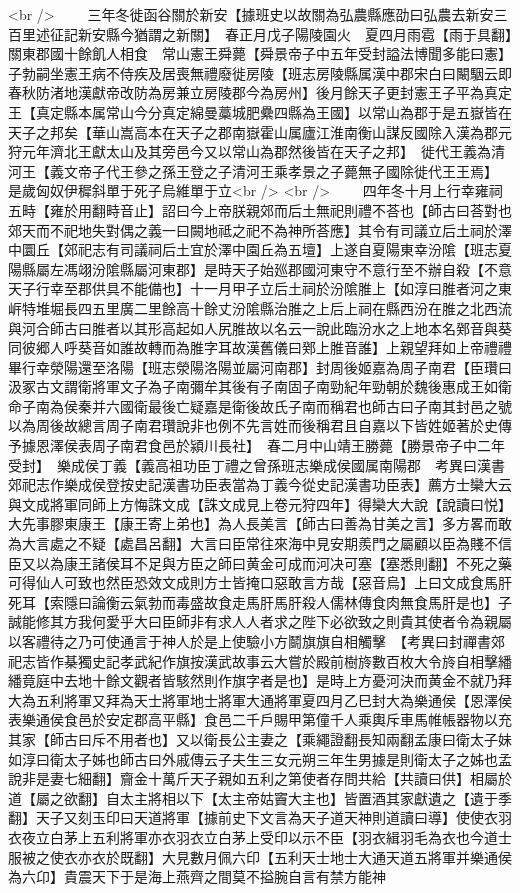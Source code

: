 <br />
　　三年冬徙函谷關於新安【據班史以故關為弘農縣應劭曰弘農去新安三百里述征記新安縣今猶謂之新關】　春正月戊子陽陵園火　夏四月雨雹【雨于具翻】　關東郡國十餘飢人相食　常山憲王舜薨【舜景帝子中五年受封謚法博聞多能曰憲】子勃嗣坐憲王病不侍疾及居喪無禮廢徙房陵【班志房陵縣属漢中郡宋白曰闞駰云即春秋防渚地漢獻帝改防為房兼立房陵郡今為房州】後月餘天子更封憲王子平為真定王【真定縣本属常山今分真定綿曼藁城肥纍四縣為王國】以常山為郡于是五嶽皆在天子之邦矣【華山嵩高本在天子之郡南嶽霍山属廬江淮南衡山謀反國除入漢為郡元狩元年濟北王獻太山及其旁邑今又以常山為郡然後皆在天子之邦】　徙代王義為清河王【義文帝子代王參之孫王登之子清河王乘孝景之子薨無子國除徙代王王焉】　是歲匈奴伊穉斜單于死子烏維單于立<br />
<br />
　　四年冬十月上行幸雍祠五畤【雍於用翻畤音止】詔曰今上帝朕親郊而后土無祀則禮不荅也【師古曰荅對也郊天而不祀地失對偶之義一曰闕地祗之祀不為神所荅應】其令有司議立后土祠於澤中圜丘【郊祀志有司議祠后土宜於澤中園丘為五壇】上遂自夏陽東幸汾隂【班志夏陽縣屬左馮翊汾隂縣屬河東郡】是時天子始廵郡國河東守不意行至不辦自殺【不意天子行幸至郡供具不能備也】十一月甲子立后土祠於汾隂脽上【如淳曰脽者河之東㟁特堆堀長四五里廣二里餘高十餘丈汾隂縣治脽之上后上祠在縣西汾在脽之北西流與河合師古曰脽者以其形高起如人尻脽故以名云一說此臨汾水之上地本名鄈音與葵同彼郷人呼葵音如誰故轉而為脽字耳故漢舊儀曰鄈上脽音誰】上親望拜如上帝禮禮畢行幸滎陽還至洛陽【班志滎陽洛陽並屬河南郡】封周後姬嘉為周子南君【臣瓚曰汲冢古文謂衛將軍文子為子南彌牟其後有子南固子南勁紀年勁朝於魏後惠成王如衛命子南為侯秦并六國衛最後亡疑嘉是衛後故氏子南而稱君也師古曰子南其封邑之號以為周後故總言周子南君瓚說非也例不先言姓而後稱君且自嘉以下皆姓姬著於史傳予據恩澤侯表周子南君食邑於潁川長社】　春二月中山靖王勝薨【勝景帝子中二年受封】　樂成侯丁義【義高祖功臣丁禮之曾孫班志樂成侯國属南陽郡　考異曰漢書郊祀志作樂成侯登按史記漢書功臣表當為丁義今從史記漢書功臣表】薦方士欒大云與文成將軍同師上方悔誅文成【誅文成見上卷元狩四年】得欒大大說【說讀曰悦】大先事膠東康王【康王寄上弟也】為人長美言【師古曰善為甘美之言】多方畧而敢為大言處之不疑【處昌呂翻】大言曰臣常往來海中見安期羨門之屬顧以臣為賤不信臣又以為康王諸侯耳不足與方臣之師曰黄金可成而河决可塞【塞悉則翻】不死之藥可得仙人可致也然臣恐效文成則方士皆掩口惡敢言方哉【惡音烏】上曰文成食馬肝死耳【索隱曰論衡云氣勃而毒盛故食走馬肝馬肝殺人儒林傳食肉無食馬肝是也】子誠能修其方我何愛乎大曰臣師非有求人人者求之陛下必欲致之則貴其使者令為親屬以客禮待之乃可使通言于神人於是上使驗小方鬬旗旗自相觸擊　【考異曰封禪書郊祀志皆作棊獨史記孝武紀作旗按漢武故事云大嘗於殿前樹旍數百枚大令旍自相擊繙繙竟庭中去地十餘文觀者皆駭然則作旗字者是也】是時上方憂河決而黄金不就乃拜大為五利將軍又拜為天士將軍地士將軍大通將軍夏四月乙巳封大為樂通侯【恩澤侯表樂通侯食邑於安定郡高平縣】食邑二千戶賜甲第僮千人乘輿斥車馬帷帳器物以充其家【師古曰斥不用者也】又以衛長公主妻之【乘繩證翻長知兩翻孟康曰衛太子妹如淳曰衛太子姊也師古曰外戚傳云子夫生三女元朔三年生男據是則衛太子之姊也孟說非是妻七細翻】齎金十萬斤天子親如五利之第使者存問共給【共讀曰供】相屬於道【屬之欲翻】自太主將相以下【太主帝姑竇大主也】皆置酒其家獻遺之【遺于季翻】天子又刻玉印曰天道將軍【據前史下文言為天子道天神則道讀曰導】使使衣羽衣夜立白茅上五利將軍亦衣羽衣立白茅上受印以示不臣【羽衣緝羽毛為衣也今道士服被之使衣亦衣於既翻】大見數月佩六印【五利天士地士大通天道五將軍并樂通侯為六卬】貴震天下于是海上燕齊之間莫不搤腕自言有禁方能神